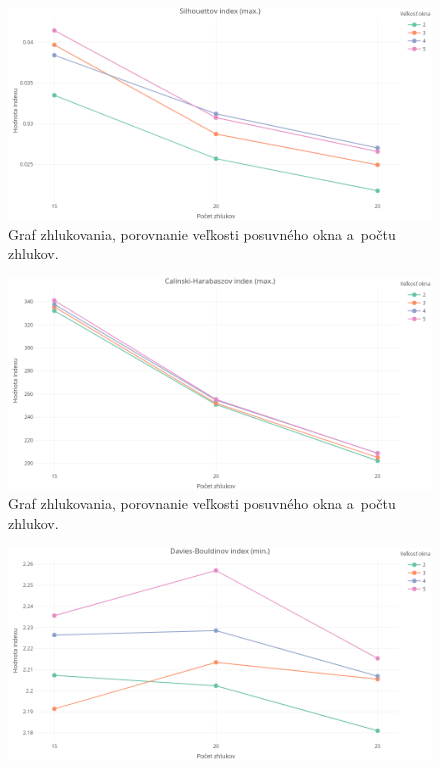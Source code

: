 \documentclass[a4paper,twoside,slovak,12pt,appendix]{article}
\begin{document}
\begin{appendices}
\begin{figure}[htbp]
  \centering
  \includegraphics[width=\textwidth]{cvi/dtw_basic_workdays_sparse/201902271850-Sil-dtw_basic_workdays_sparse.png}
  \caption{Graf zhlukovania, porovnanie veľkosti posuvného okna a~počtu zhlukov.}
\end{figure}
\begin{figure}[htbp]
  \centering
  \includegraphics[width=\textwidth]{cvi/dtw_basic_workdays_sparse/201902271850-CH-dtw_basic_workdays_sparse.png}
  \caption{Graf zhlukovania, porovnanie veľkosti posuvného okna a~počtu zhlukov.}
\end{figure}
\begin{figure}[htbp]
  \centering
  \includegraphics[width=\textwidth]{cvi/dtw_basic_workdays_sparse/201902271850-DB-dtw_basic_workdays_sparse.png}

\end{figure}
\end{appendices}
\end{document}
